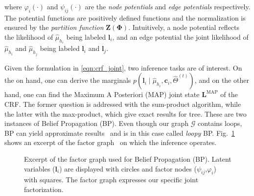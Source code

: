 where $\varphi_i(\cdot)$ and $\psi_{ij}(\cdot)$ are the \emph{node potentials}
and \emph{edge potentials} respectively. The potential functions are positively
defined functions and the normalization is ensured by the
\emph{partition function} $\mathbf{Z}(\boldsymbol{\Phi})$. Intuitively, a node 
potential reflects the likelihood of $\hat{\mu}_{h_i}$ being labeled
$\mathbf{l}_i$, and an edge potential the joint likelihood of $\hat{\mu}_{h_i}$
and $\hat{\mu}_{h_j}$ being labeled $\mathbf{l}_i$ and $\mathbf{l}_j$.

Given the formulation in \eqref{eqn:crf_joint}, two inference tasks are of
interest. On the on hand, one can derive the marginals
$p(\mathbf{l}_i\mid\hat{\mu}_{h_i},\mathbf{c}_i,\hat{\Theta}^{(t)})$, and on the
other hand, one can find the Maximum A Posteriori (MAP) joint state
$\mathbf{L}^\text{MAP}$ of the CRF. The former question is addressed with the
sum-product algorithm, while the latter with the max-product, which give exact
results for tree. These are two instances of Belief Propagation (BP). Even
though our graph $\mathcal{G}$ contains loops, BP can yield approximate
results~\cite{mooij07sufficient} and is in this case called \emph{loopy} BP.
Fig.~\ref{fig:fg} shows an excerpt of the factor
graph~\cite{kschischang01factor} on which the inference operates.

\begin{figure}[t]
\centering
{}
\caption{Excerpt of the factor graph used for Belief Propagation (BP). Latent
variables ($\mathbf{l}_i$) are displayed with circles and factor nodes
($\psi_{ij}$,$\varphi_i$) with squares. The factor graph expresses our specific
joint factorization.}
\label{fig:fg}
\end{figure}

